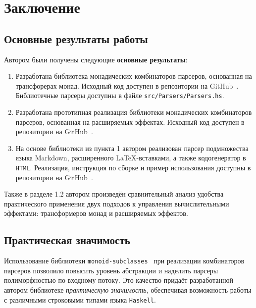 \chapter{Заключение}

\section{Основные результаты работы} 
  
  Автором были получены следующие \textbf{основные результаты}:

  \begin{enumerate}
    
    \item Разработана библиотека монадических комбинаторов парсеров, основанная 
    на трансфорерах монад. Исходный код доступен в репозитории на GitHub~\cite{mdParse}. Библиотечные парсеры доступны в файле \lstinline{src/Parsers/Parsers.hs}. 

    \item Разработана прототипная реализация библиотеки монадических комбинаторов 
    парсеров, основанная на расширяемых эффектах. Исходный код доступен в 
    репозитории на GitHub~\cite{mdParse}. 

    \item На основе библиотеки из пункта 1 автором реализован парсер подмножества языка
    Markdown, расширенного \LaTeX-вставками, а также кодогенератор в 
    \lstinline{HTML}. Реализация, инструкция по сборке и пример использования 
    доступны в репозитории на GitHub~\cite{mdParse}. 
  \end{enumerate}

  Также в разделе 1.2 автором произведён сравнительный анализ удобства 
  практического применения двух подходов к управления вычислительными эффектами: 
  трансформеров монад и расширяемых эффектов. 

\section{Практическая значимость}

  Использование библиотеки \lstinline{monoid-subclasses}~\cite{monoidSubclassesHackage}
  при реализации комбинаторов парсеров  
  позволило повысить уровень абстракции и наделить парсеры 
  полиморфностью по входному потоку. Это качество 
  придаёт разработанной автором библиотеке \emph{практическую значимость}, 
  обеспечивая возможность работы с различными строковыми типами языка \lstinline{Haskell}.  

